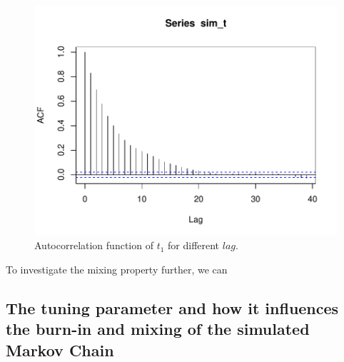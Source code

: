 \begin{figure}[h]
    \centering
    \includegraphics{Images/acf_t_10000.pdf}
    \caption{Autocorrelation function of $t_1$ for different $lag$. }
    \label{fig:acf_t}
\end{figure}

To investigate the mixing property further, we can 

\subsection{The tuning parameter and how it influences the burn-in and mixing of the simulated Markov Chain}

